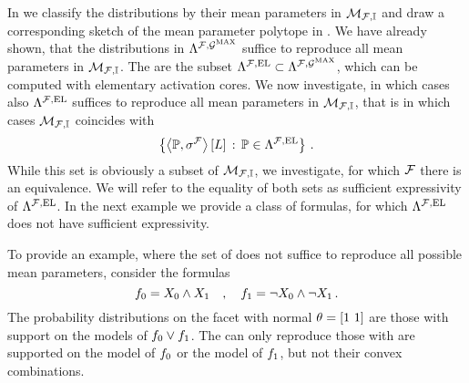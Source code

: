 In  we classify the distributions by their mean parameters in $\mathcal{M}_{\mathcal{F},\mathbb{I}}$ and draw a corresponding sketch of the mean parameter polytope in .
We have already shown, that the distributions in $\Lambda^{\mathcal{F},\mathcal{G}^{\mathrm{MAX}}}$ suffice to reproduce all mean parameters in $\mathcal{M}_{\mathcal{F},\mathbb{I}}$.
The \HybridLogicNetworks{} are the subset $\Lambda^{\mathcal{F},\mathrm{EL}}\subset\Lambda^{\mathcal{F},\mathcal{G}^{\mathrm{MAX}}}$, which can be computed with elementary activation cores.
We now investigate, in which cases also $\Lambda^{\mathcal{F},\mathrm{EL}}$ suffices to reproduce all mean parameters in $\mathcal{M}_{\mathcal{F},\mathbb{I}}$, that is in which cases $\mathcal{M}_{\mathcal{F},\mathbb{I}}$ coincides with
\begin{align*}
    \left\{ \left\langle \mathbb{P},\sigma^{\mathcal{F}}\right\rangle \left[ L \right] \,:\, \mathbb{P}\in\Lambda^{\mathcal{F},\mathrm{EL}} \right\} \, .
\end{align*}
While this set is obviously a subset of $\mathcal{M}_{\mathcal{F},\mathbb{I}}$, we investigate, for which $\mathcal{F}$ there is an equivalence.
We will refer to the equality of both sets as sufficient expressivity of $\Lambda^{\mathcal{F},\mathrm{EL}}$.
In the next example we provide a class of formulas, for which $\Lambda^{\mathcal{F},\mathrm{EL}}$ does not have sufficient expressivity.

\begin{example}
    \label{exa:insufficentHLNsetExpressivity}
    To provide an example, where the set of \HybridLogicNetworks{} does not suffice to reproduce all possible mean parameters, consider the formulas
    \[ f_{0} = X_{0} \land X_{1} \quad, \quad f_{1} = \lnot X_{0} \land \lnot X_{1} \, . \]
    The probability distributions on the facet with normal $\theta=[1\,\, 1]$ are those with support on the models of $f_{0}\lor f_{1}$.
    The \HybridLogicNetworks{} can only reproduce those with are supported on the model of $f_{0}$ or the model of $f_{1}$, but not their convex combinations.

\end{example}


